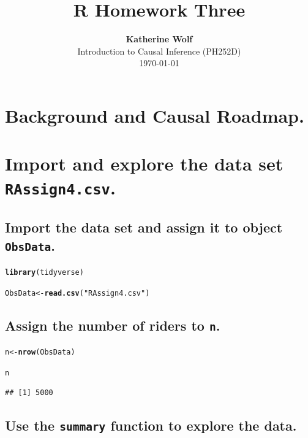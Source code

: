 \documentclass{article}\usepackage[]{graphicx}\usepackage[]{xcolor}
\title{\textbf{R Homework Three}}
\author{\textbf{Katherine Wolf}\\ Introduction to Causal Inference (PH252D)\\ \today}
\date{}
\makeatletter
\newcommand{\hlstr}[1]{\textcolor[rgb]{0.192,0.494,0.8}{#1}}%
\newcommand{\hlstd}[1]{\textcolor[rgb]{0.345,0.345,0.345}{#1}}%
\newcommand{\hlkwb}[1]{\textcolor[rgb]{0.69,0.353,0.396}{#1}}%
\newcommand{\hlkwd}[1]{\textcolor[rgb]{0.737,0.353,0.396}{\textbf{#1}}}%
\newenvironment{kframe}{%
 \def\at@end@of@kframe{}%
 \ifinner\ifhmode%
  \def\at@end@of@kframe{\end{minipage}}%
  \begin{minipage}{\columnwidth}%
 \fi\fi%
 \def\FrameCommand##1{\hskip\@totalleftmargin \hskip-\fboxsep
 \colorbox{shadecolor}{##1}\hskip-\fboxsep
     \hskip-\linewidth \hskip-\@totalleftmargin \hskip\columnwidth}%
 \MakeFramed {\advance\hsize-\width
   \@totalleftmargin\z@ \linewidth\hsize
   \@setminipage}}%
 {\par\unskip\endMakeFramed%
 \at@end@of@kframe}
\newenvironment{knitrout}{}{} %
\makeatother
\begin{document}
\maketitle

\section{Background and Causal Roadmap.}

\section{Import and explore the data set \texttt{RAssign4.csv}.}

  \subsection{Import the data set and assign it to object \texttt{ObsData}.}
  
\begin{knitrout}
\color{fgcolor}\begin{kframe}
\begin{alltt}
\hlkwd{library}\hlstd{(tidyverse)}

\hlstd{ObsData} \hlkwb{<-} \hlkwd{read.csv}\hlstd{(}\hlstr{"RAssign4.csv"}\hlstd{)}
\end{alltt}
\end{kframe}
\end{knitrout}

  \subsection{Assign the number of riders to \texttt{n}.}
  
\begin{knitrout}
\color{fgcolor}\begin{kframe}
\begin{alltt}
\hlstd{n} \hlkwb{<-} \hlkwd{nrow}\hlstd{(ObsData)}

\hlstd{n}
\end{alltt}
\begin{verbatim}
## [1] 5000
\end{verbatim}
\end{kframe}
\end{knitrout}

  \subsection{Use the \texttt{summary} function to explore the data.}
  
\end{document}
